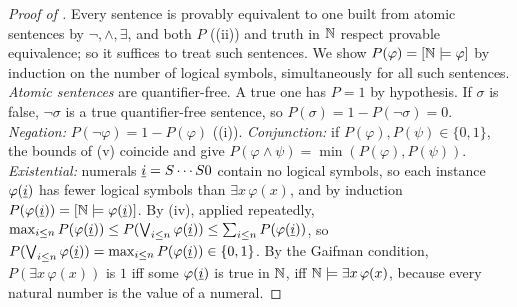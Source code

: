 \begin{proof}[Proof of ]
Every sentence is provably equivalent to one built from atomic sentences by $\neg,\wedge,\exists$, and both $P$ ((ii)) and truth in $\mathbb{N}$ respect provable equivalence; so it suffices to treat such sentences. We show $P(\varphi)=[\mathbb{N}\models\varphi]$ by induction on the number of logical symbols, simultaneously for all such sentences.
\emph{Atomic sentences} are quantifier-free. A true one has $P=1$ by hypothesis. If $\sigma$ is false, $\neg\sigma$ is a true quantifier-free sentence, so $P(\sigma)=1-P(\neg\sigma)=0$.
\emph{Negation:} $P(\neg\varphi)=1-P(\varphi)$ ((i)).
\emph{Conjunction:} if $P(\varphi),P(\psi)\in\{0,1\}$, the bounds of (v) coincide and give $P(\varphi\wedge\psi)=\min(P(\varphi),P(\psi))$.
\emph{Existential:} numerals $\underline{i}=S\cdots S0$ contain no logical symbols, so each instance $\varphi(\underline{i})$ has fewer logical symbols than $\exists x\,\varphi(x)$, and by induction $P(\varphi(\underline{i}))=[\mathbb{N}\models\varphi(\underline{i})]$. By (iv), applied repeatedly, $\max_{i\le n}P(\varphi(\underline{i}))\le P(\bigvee_{i\le n}\varphi(\underline{i}))\le\sum_{i\le n}P(\varphi(\underline{i}))$, so $P(\bigvee_{i\le n}\varphi(\underline{i}))=\max_{i\le n}P(\varphi(\underline{i}))\in\{0,1\}$. By the Gaifman condition, $P(\exists x\,\varphi(x))$ is $1$ iff some $\varphi(\underline{i})$ is true in $\mathbb{N}$, iff $\mathbb{N}\models\exists x\,\varphi(x)$, because every natural number is the value of a numeral.
\end{proof}

